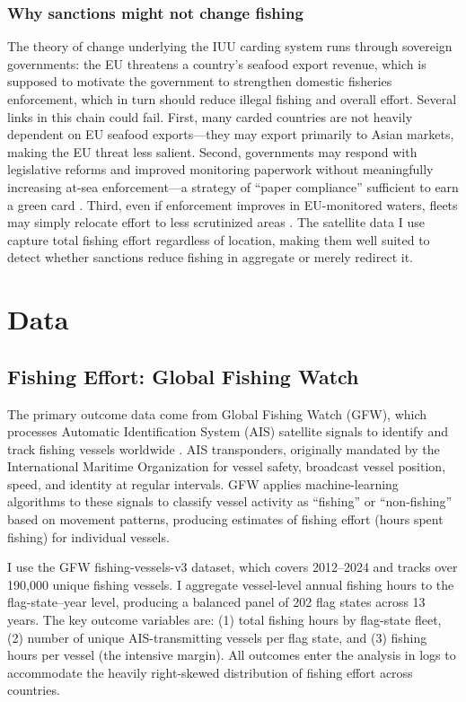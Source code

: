 \documentclass[12pt]{article}
\begin{document}
\subsubsection*{Why sanctions might not change fishing} The theory of change underlying the IUU carding system runs through sovereign governments: the EU threatens a country's seafood export revenue, which is supposed to motivate the government to strengthen domestic fisheries enforcement, which in turn should reduce illegal fishing and overall effort. Several links in this chain could fail. First, many carded countries are not heavily dependent on EU seafood exports---they may export primarily to Asian markets, making the EU threat less salient. Second, governments may respond with legislative reforms and improved monitoring paperwork without meaningfully increasing at-sea enforcement---a strategy of ``paper compliance'' sufficient to earn a green card \citep{fernandes2011does}. Third, even if enforcement improves in EU-monitored waters, fleets may simply relocate effort to less scrutinized areas \citep{tickler2018far, boerder2018global}. The satellite data I use capture total fishing effort regardless of location, making them well suited to detect whether sanctions reduce fishing in aggregate or merely redirect it.


\section{Data}
\label{sec:data}

\subsection{Fishing Effort: Global Fishing Watch}

The primary outcome data come from Global Fishing Watch (GFW), which processes Automatic Identification System (AIS) satellite signals to identify and track fishing vessels worldwide \citep{kroodsma2018tracking}. AIS transponders, originally mandated by the International Maritime Organization for vessel safety, broadcast vessel position, speed, and identity at regular intervals. GFW applies machine-learning algorithms to these signals to classify vessel activity as ``fishing'' or ``non-fishing'' based on movement patterns, producing estimates of fishing effort (hours spent fishing) for individual vessels.

I use the GFW fishing-vessels-v3 dataset, which covers 2012--2024 and tracks over 190,000 unique fishing vessels. I aggregate vessel-level annual fishing hours to the flag-state--year level, producing a balanced panel of 202 flag states across 13 years. The key outcome variables are: (1) total fishing hours by flag-state fleet, (2) number of unique AIS-transmitting vessels per flag state, and (3) fishing hours per vessel (the intensive margin). All outcomes enter the analysis in logs to accommodate the heavily right-skewed distribution of fishing effort across countries.
\end{document}
